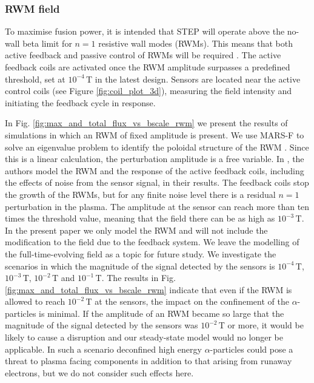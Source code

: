 \documentclass[10pt, a4paper, twoside]{article}
\begin{document}
\newpage
\subsubsection{RWM field}
\label{sec:rwm_field}

To maximise fusion power, it is intended that STEP will operate above the no-wall beta limit for $n=1$ resistive wall modes (RWMs). This means that both active feedback and passive control of RWMs will be required \cite{xia2023}. The active feedback coils are activated once the RWM amplitude surpasses a predefined threshold, set at $10^{-4}\,$T in the latest design.
Sensors are located near the active control coils (see Figure \ref{fig:coil_plot_3d}), measuring the field intensity and initiating the feedback cycle in response.

In Fig. \ref{fig:max_and_total_flux_vs_bscale_rwm} we present the results of simulations in which an RWM of fixed amplitude is present. 
We use MARS-F to solve an eigenvalue problem to identify the poloidal structure of the RWM \cite{xia2023}. Since this is a linear calculation, the perturbation amplitude is a free variable.
In \cite{xia2023}, the authors model the RWM and the response of the active feedback coils, including the effects of noise from the sensor signal, in their results. The feedback coils stop the growth of the RWMs, but for any finite noise level there is a residual $n=1$ perturbation in the plasma. The amplitude at the sensor can reach more than ten times the threshold value, meaning that the field there can be as high as $10^{-3}\,$T. In the present paper we only model the RWM and will not include the modification to the field due to the feedback system. We leave the modelling of the full-time-evolving field as a topic for future study. We investigate the scenarios in which the magnitude of the signal detected by the sensors is $10^{-4}\,$T, $10^{-3}\,$T, $10^{-2}\,$T and $10^{-1}\,$T. The results in Fig. \ref{fig:max_and_total_flux_vs_bscale_rwm} indicate that even if the RWM is allowed to reach $10^{-2}\,$T at the sensors, the impact on the confinement of the $\alpha$-particles is minimal. If the amplitude of an RWM became so large that the magnitude of the signal detected by the sensors was $10^{-2}\,$T or more, it would be likely to cause a disruption and our steady-state model would no longer be applicable. In such a scenario deconfined high energy $\alpha$-particles could pose a threat to plasma facing components in addition to that arising from runaway electrons, but we do not consider such effects here. 
\end{document}
